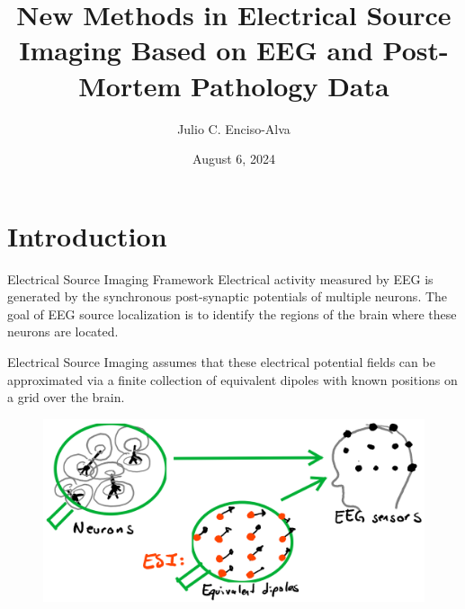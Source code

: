 \documentclass[progressbar=head]{beamer}
\title{New Methods in Electrical Source Imaging Based on EEG and Post-Mortem Pathology Data}
\date{August 6, 2024}
\author{Julio C. Enciso-Alva}
\institute{University   of Texas at Arlington}
\newcommand{\R}{\mathbb{R}}
\begin{document}
{
\maketitle

\begin{frame}%
\tableofcontents
\end{frame}

}

{
\section{Introduction}
}

\begin{frame}{Electrical Source Imaging Framework}
    Electrical activity measured by EEG is generated by the synchronous post-synaptic potentials of multiple neurons.
    The goal of EEG source localization is to identify the regions of the brain where these neurons are located.
    
    Electrical Source Imaging assumes that 
    these electrical potential fields
    can be 
    approximated via a finite collection 
    of equivalent dipoles
    with known positions on a grid over the brain.

\begin{figure}
\centering
\includegraphics[width=0.6\linewidth]{./img_oldbeamer/sketch03}
\end{figure}
\end{frame}
\end{document}
